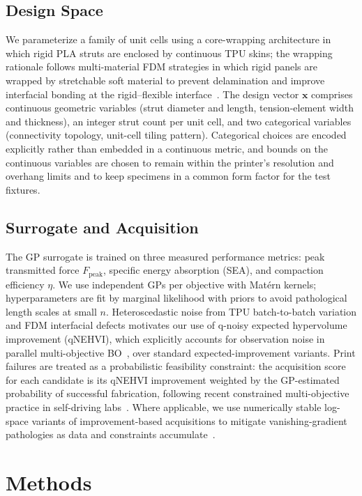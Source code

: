 \documentclass[10pt]{article}
\begin{document}
\subsection{Design Space}
We parameterize a family of unit cells using a core-wrapping
architecture in which rigid PLA struts are enclosed by continuous TPU
skins; the wrapping rationale follows multi-material FDM strategies in
which rigid panels are wrapped by stretchable soft material to prevent
delamination and improve interfacial bonding at the rigid--flexible
interface~\citep{ye2023multimaterial}. The design vector $\mathbf{x}$
comprises continuous geometric variables (strut diameter and length,
tension-element width and thickness), an integer strut count per unit
cell, and two categorical variables (connectivity topology, unit-cell
tiling pattern). Categorical choices are encoded explicitly rather
than embedded in a continuous metric, and bounds on the continuous
variables are chosen to remain within the printer's resolution and
overhang limits and to keep specimens in a common form factor for the
test fixtures.

\subsection{Surrogate and Acquisition}
The GP surrogate is trained on three measured performance metrics:
peak transmitted force $F_\mathrm{peak}$, specific energy absorption
(SEA), and compaction efficiency $\eta$. We use independent GPs per
objective with Mat\'ern kernels; hyperparameters are fit by marginal
likelihood with priors to avoid pathological length scales at small $n$.
Heteroscedastic noise from TPU batch-to-batch variation and FDM
interfacial defects motivates our use of q-noisy expected hypervolume
improvement (qNEHVI), which explicitly accounts for observation noise
in parallel multi-objective BO~\citep{daulton2021nehvi}, over standard
expected-improvement variants. Print failures are treated as a
probabilistic feasibility constraint: the acquisition score for each
candidate is its qNEHVI improvement weighted by the GP-estimated
probability of successful fabrication, following recent constrained
multi-objective practice in self-driving labs~\citep{low2024evolution}.
Where applicable, we use numerically stable log-space variants of
improvement-based acquisitions to mitigate vanishing-gradient
pathologies as data and constraints
accumulate~\citep{ament2023logei}.

\section{Methods}
\end{document}
